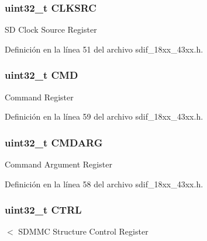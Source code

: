 \subsubsection[{\texorpdfstring{C\+L\+K\+S\+RC}{CLKSRC}}]{ uint32\+\_\+t C\+L\+K\+S\+RC}\hypertarget{struct_l_p_c___s_d_m_m_c___t_ae916d4c8d22c8fc2956d6627034aba64}{}\label{struct_l_p_c___s_d_m_m_c___t_ae916d4c8d22c8fc2956d6627034aba64}
SD Clock Source Register 

Definición en la línea 51 del archivo sdif\+\_\+18xx\+\_\+43xx.\+h.

\subsubsection[{\texorpdfstring{C\+MD}{CMD}}]{ uint32\+\_\+t C\+MD}\hypertarget{struct_l_p_c___s_d_m_m_c___t_adcf812cbe5147d300507d59d4a55935d}{}\label{struct_l_p_c___s_d_m_m_c___t_adcf812cbe5147d300507d59d4a55935d}
Command Register 

Definición en la línea 59 del archivo sdif\+\_\+18xx\+\_\+43xx.\+h.

\subsubsection[{\texorpdfstring{C\+M\+D\+A\+RG}{CMDARG}}]{ uint32\+\_\+t C\+M\+D\+A\+RG}\hypertarget{struct_l_p_c___s_d_m_m_c___t_a36131cec3559ac2988019df27ecdace4}{}\label{struct_l_p_c___s_d_m_m_c___t_a36131cec3559ac2988019df27ecdace4}
Command Argument Register 

Definición en la línea 58 del archivo sdif\+\_\+18xx\+\_\+43xx.\+h.

\subsubsection[{\texorpdfstring{C\+T\+RL}{CTRL}}]{ uint32\+\_\+t C\+T\+RL}\hypertarget{struct_l_p_c___s_d_m_m_c___t_a15fc8d35f045f329b80c544bef35ff64}{}\label{struct_l_p_c___s_d_m_m_c___t_a15fc8d35f045f329b80c544bef35ff64}
$<$ S\+D\+M\+MC Structure Control Register 

